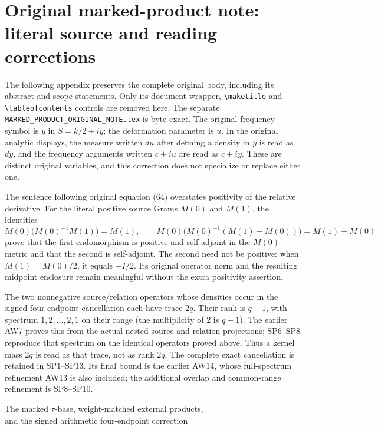 

\section*{Original marked-product note: literal source and reading corrections}

The following appendix preserves the complete original body, including
its abstract and scope statements. Only its document wrapper,
\verb|\maketitle| and \verb|\tableofcontents| controls are removed here.
The separate \texttt{MARKED\_PRODUCT\_ORIGINAL\_NOTE.tex} is byte exact.
The original frequency symbol is $y$ in $S=k/2+iy$; the deformation
parameter is $u$. In the original analytic displays, the measure
written $du$ after defining a density in $y$ is read as $dy$, and the
frequency arguments written $c+iu$ are read as $c+iy$.
These are distinct original variables, and this correction does not
specialize or replace either one.

The sentence following original equation (64) overstates positivity
of the relative derivative. For the literal positive source Grams
$M(0)$ and $M(1)$, the identities
\[
 M(0)\bigl(M(0)^{-1}M(1)\bigr)=M(1),\qquad
 M(0)\bigl(M(0)^{-1}(M(1)-M(0))\bigr)=M(1)-M(0)
\]
prove that the first endomorphism is positive and self-adjoint in the
$M(0)$ metric and that the second is self-adjoint. The second need
not be positive: when $M(1)=M(0)/2$, it equals $-I/2$.
Its original operator norm and the resulting midpoint enclosure
remain meaningful without the extra positivity assertion.

The two nonnegative source/relation operators whose densities occur
in the signed four-endpoint cancellation each have trace $2q$.
Their rank is $q+1$, with spectrum $1,2,\ldots,2,1$ on their range
(the multiplicity of $2$ is $q-1$). The earlier AW7 proves this from the
actual nested source and relation projections; SP6--SP8 reproduce
that spectrum on the identical operators proved above. Thus a kernel mass
$2q$ is read as that trace, not as rank $2q$. The complete exact
cancellation is retained in SP1--SP13. Its final bound is the earlier
AW14, whose full-spectrum refinement AW13 is also included; the
additional overlap and common-range refinement is SP8--SP10.

\begin{center}\large
The marked $\tau$-base, weight-matched external products,\\
and the signed arithmetic four-endpoint correction
\end{center}
